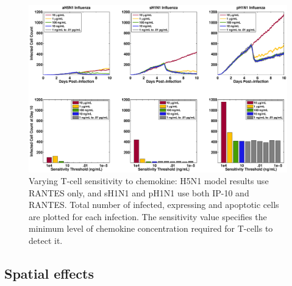 \documentclass[10pt]{article}
\begin{document}
\begin{figure}[ht!]
\begin{center}
 \includegraphics[width=\textwidth]{sensitivity}
 \end{center}
\caption{Varying T-cell sensitivity to chemokine: H5N1 model results use RANTES  only, and sH1N1 and pH1N1 use both IP-10 and RANTES. Total number of infected, expressing and apoptotic cells are plotted for each infection.  The sensitivity value specifies the minimum level of chemokine concentration required for T-cells to detect it. } 
 \label{fig:sensitivity}
\end{figure}


\subsection*{Spatial effects}
\end{document}
